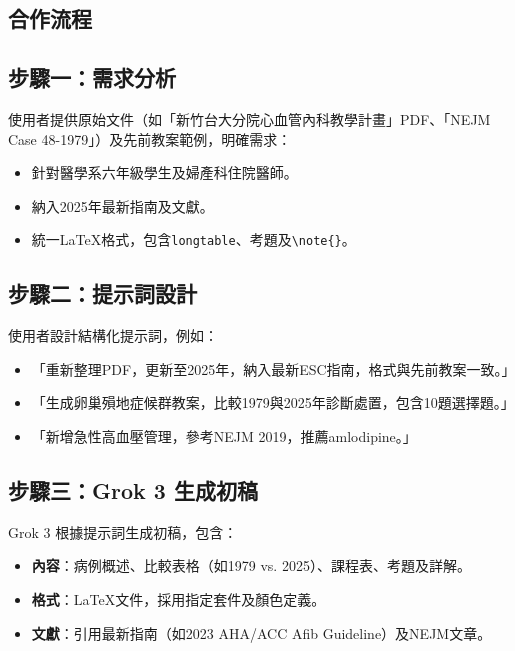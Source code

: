 \documentclass[12pt,a4paper]{article}
\begin{document}
\vspace{0.5cm}

\subsection{合作流程}

\subsection{步驟一：需求分析}
使用者提供原始文件（如「新竹台大分院心血管內科教學計畫」PDF、「NEJM Case 48-1979」）及先前教案範例，明確需求：
\begin{itemize}[nosep]
    \item 針對醫學系六年級學生及婦產科住院醫師。
    \item 納入2025年最新指南及文獻。
    \item 統一LaTeX格式，包含\verb|longtable|、考題及\verb|\note{}|。
\end{itemize}

\subsection{步驟二：提示詞設計}
使用者設計結構化提示詞，例如：
\begin{itemize}[nosep]
    \item 「重新整理PDF，更新至2025年，納入最新ESC指南，格式與先前教案一致。」
    \item 「生成卵巢殞地症候群教案，比較1979與2025年診斷處置，包含10題選擇題。」
    \item 「新增急性高血壓管理，參考NEJM 2019，推薦amlodipine。」
\end{itemize}

\subsection{步驟三：Grok 3 生成初稿}
Grok 3 根據提示詞生成初稿，包含：
\begin{itemize}[nosep]
    \item \textbf{內容}：病例概述、比較表格（如1979 vs. 2025）、課程表、考題及詳解。
    \item \textbf{格式}：LaTeX文件，採用指定套件及顏色定義。
    \item \textbf{文獻}：引用最新指南（如2023 AHA/ACC Afib Guideline）及NEJM文章。
\end{itemize}
\end{document}
